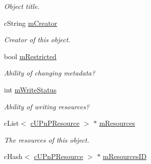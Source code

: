 \begin{CompactItemize}
\begin{CompactList}\small\item\em Object title. \item\end{CompactList}\item 
\hypertarget{classcUPnPClassObject_a5e80e4679babeaaee989b0591046137}{
cString \hyperlink{classcUPnPClassObject_a5e80e4679babeaaee989b0591046137}{mCreator}}
\label{classcUPnPClassObject_a5e80e4679babeaaee989b0591046137}

\begin{CompactList}\small\item\em Creator of this object. \item\end{CompactList}\item 
\hypertarget{classcUPnPClassObject_d3709ce6e3c60a3cea616e437408d9b5}{
bool \hyperlink{classcUPnPClassObject_d3709ce6e3c60a3cea616e437408d9b5}{mRestricted}}
\label{classcUPnPClassObject_d3709ce6e3c60a3cea616e437408d9b5}

\begin{CompactList}\small\item\em Ability of changing metadata? \item\end{CompactList}\item 
\hypertarget{classcUPnPClassObject_63ae3b00533846717e40fdf4729d50c9}{
int \hyperlink{classcUPnPClassObject_63ae3b00533846717e40fdf4729d50c9}{mWriteStatus}}
\label{classcUPnPClassObject_63ae3b00533846717e40fdf4729d50c9}

\begin{CompactList}\small\item\em Ability of writing resources? \item\end{CompactList}\item 
\hypertarget{classcUPnPClassObject_3da123add3d4de3c6d9a6fe76c666253}{
cList$<$ \hyperlink{classcUPnPResource}{cUPnPResource} $>$ $\ast$ \hyperlink{classcUPnPClassObject_3da123add3d4de3c6d9a6fe76c666253}{mResources}}
\label{classcUPnPClassObject_3da123add3d4de3c6d9a6fe76c666253}

\begin{CompactList}\small\item\em The resources of this object. \item\end{CompactList}\item 
\hypertarget{classcUPnPClassObject_36028ece195b24fa9ff01c2713a8a291}{
cHash$<$ \hyperlink{classcUPnPResource}{cUPnPResource} $>$ $\ast$ \hyperlink{classcUPnPClassObject_36028ece195b24fa9ff01c2713a8a291}{mResourcesID}}
\label{classcUPnPClassObject_36028ece195b24fa9ff01c2713a8a291}


\end{CompactItemize}
